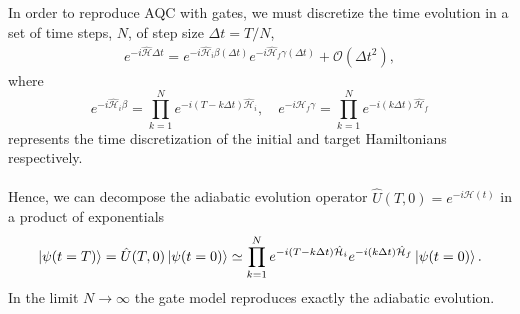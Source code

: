In order to reproduce AQC with gates, we must discretize the time evolution in a set of time steps, $N$, of step size $\Delta t = T/N$,
\begin{align}
    e^{-i\hat{\mathcal{H}}\Delta t} = e^{-i\hat{\mathcal{H}}_{i}\beta(\Delta t)}e^{-i\hat{\mathcal{H}}_{f}\gamma(\Delta t)} + \mathcal{O}(\Delta t^{2}),
\end{align}
where
\begin{equation}
    e^{-i\hat{\mathcal{H}}_{i}\beta} = \prod_{k=1}^{N}e^{-i\left(T-k\Delta t\right)\hat{\mathcal{H}}_{i}}, \quad e^{-i\hat{\mathcal{H}}_{f}\gamma} = \prod_{k=1}^{N}e^{-i\left(k\Delta t\right)\hat{\mathcal{H}}_{f}}
\end{equation}
represents the time discretization of the initial and target Hamiltonians respectively. \\\\
Hence, we can decompose the adiabatic evolution operator $\hat{U}(T,0) = e^{-i\mathcal{H}(t)}$ in a product of exponentials
\begin{equation}
    \ket{\psi(t = T)} = \hat{U}(T,0)\ket{\psi(t = 0)} \simeq \prod_{k=1}^{N}e^{-i\left(T-k\Delta t\right)\hat{\mathcal{H}}_{i}}e^{-i\left(k\Delta t\right)\hat{\mathcal{H}}_{f}}\ket{\psi(t = 0)}. 
\end{equation}
In the limit $N \rightarrow \infty$ the gate model reproduces exactly the adiabatic evolution.
